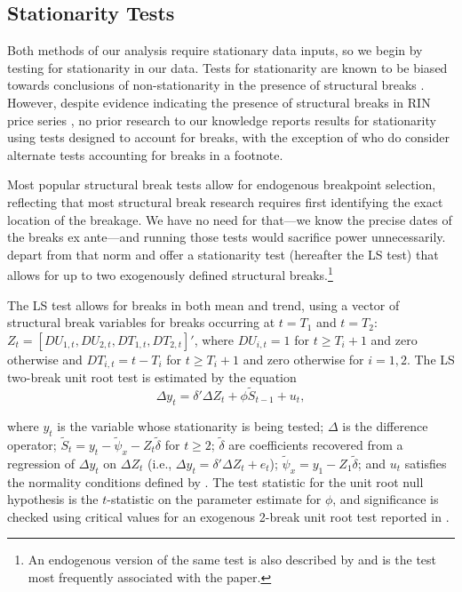 \documentclass[11pt]{article}
\begin{document}
\subsection{Stationarity Tests}

Both methods of our analysis require stationary data inputs, so we begin by testing for stationarity in our data. Tests for stationarity are known to be biased towards conclusions of non-stationarity in the presence of structural breaks \citep{Perron1989}. However, despite evidence indicating the presence of structural breaks in RIN price series \citep{Mason2016}, no prior research to our knowledge reports results for stationarity using tests designed to account for breaks, with the exception of \cite{Lade2018a} who do consider alternate tests accounting for breaks in a footnote. 

Most popular structural break tests allow for endogenous breakpoint selection, reflecting that most structural break research requires first identifying the exact location of the breakage. We have no need for that---we know the precise dates of the breaks ex ante---and running those tests would sacrifice power unnecessarily. \cite{Lee2003} depart from that norm and offer a stationarity test (hereafter the LS test) that allows for up to two exogenously defined structural breaks.\footnote{An endogenous version of the same test is also described by \cite{Lee2003} and is the test most frequently associated with the paper.}

The LS test allows for breaks in both mean and trend, using a vector of structural break variables for breaks occurring at $t=T_1$ and $t=T_2$:  $Z_t=[DU_{1,t},DU_{2,t},DT_{1,t},DT_{2,t}]'$, where $DU_{i,t}=1$ for $t\ge T_i+1$ and zero otherwise and $DT_{i,t}=t-T_i$ for $t\ge T_i+1$ and zero otherwise for $i=1,2$. The LS two-break unit root test is estimated by the equation
\begin{equation}
\Delta y_t=\delta'\Delta Z_t+\phi \tilde{S}_{t-1}+u_t,
\end{equation}

\noindent where $y_t$ is the variable whose stationarity is being tested; $\Delta$ is the difference operator; $\tilde{S}_t=y_t-\tilde{\psi}_x-Z_t\tilde{\delta}$ for $t\ge2$; $\tilde{\delta}$ are coefficients recovered from a regression of $\Delta y_t$ on $\Delta Z_t$ (i.e., $\Delta y_t=\delta'\Delta Z_t+e_t$);  $\tilde{\psi}_x=y_1-Z_1\tilde{\delta}$; and $u_t$ satisfies the normality conditions defined by \citet[p. 336]{Phillips1988}. The test statistic for the unit root null hypothesis is the $t$-statistic on the parameter estimate for $\phi$, and significance is checked using critical values for an exogenous 2-break unit root test reported in \cite{Lee2003}.
\end{document}
